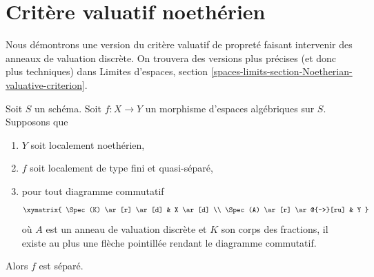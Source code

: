 \section{Critère valuatif noethérien}
\label{section-Noetherian-valuative-criterion}

\noindent
Nous démontrons une version du critère valuatif de propreté
faisant intervenir des anneaux de valuation discrète. On trouvera des versions plus précises
(et donc plus techniques) dans
Limites d'espaces, section
\ref{spaces-limits-section-Noetherian-valuative-criterion}.

\begin{lemma}
\label{lemma-check-separated-dvr}
Soit $S$ un schéma. Soit $f : X \to Y$ un morphisme d'espaces algébriques
sur $S$. Supposons que
\begin{enumerate}
\item $Y$ soit localement noethérien,
\item $f$ soit localement de type fini et quasi-séparé,
\item pour tout diagramme commutatif
$$
\xymatrix{
\Spec(K) \ar[r] \ar[d] & X \ar[d] \\
\Spec(A) \ar[r] \ar@{-->}[ru] & Y
}
$$
où $A$ est un anneau de valuation discrète et $K$ son corps des fractions,
il existe au plus une flèche pointillée rendant le diagramme commutatif.
\end{enumerate}
Alors $f$ est séparé.
\end{lemma}

